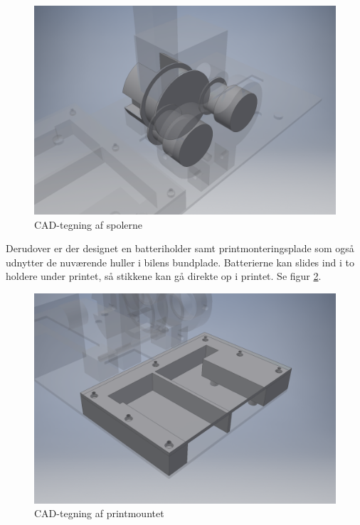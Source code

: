 \begin{figure}[h!]
	\centering
	\includegraphics[width=.8\textwidth]{billeder/spoler_3d.png}
	\caption{CAD-tegning af spolerne}
	\label{fig:spole_3d_fig}
\end{figure}

Derudover er der designet en batteriholder samt printmonteringsplade som også udnytter de nuværende huller i bilens bundplade. Batterierne kan slides ind i to holdere under printet, så stikkene kan gå direkte op i printet. Se figur \ref{fig:printmount_3d}.\\

\begin{figure}[h!]
	\centering
	\includegraphics[width=.8\textwidth]{billeder/printmount_3d.png}
	\caption{CAD-tegning af printmountet}
	\label{fig:printmount_3d}
\end{figure}